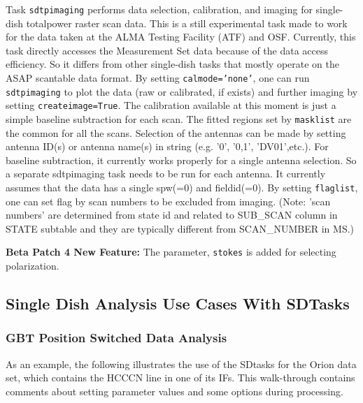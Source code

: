         Task {\tt sdtpimaging} performs data selection, calibration, and imaging for single-dish
        totalpower raster scan data.  This is a still experimental task made to work for
        the data taken at the ALMA Testing Facility (ATF) and OSF. Currently, this task directly
        accesses the Measurement Set data because of the data access efficiency.
        So it differs from other single-dish tasks that mostly operate on the ASAP scantable
        data format.  By setting {\tt calmode='none'}, one can run {\tt sdtpimaging} to plot the data
        (raw or calibrated, if exists) and further imaging by setting {\tt createimage=True}.
        The calibration available at this moment is just a simple baseline subtraction for
        each scan. The fitted regions set by {\tt masklist} are the common for all the scans.
        Selection of the antennas can be made by setting antenna ID(s) or antenna name(s)
        in string (e.g. '0', '0,1', 'DV01',etc.).
        For baseline subtraction, it currently works properly for a single antenna selection.
        So a separate sdtpimaging task needs to be run for each antenna.
        It currently assumes that the data has a single spw(=0) and fieldid(=0).
        By setting {\tt flaglist}, one can set flag by scan numbers to be excluded from imaging.
        (Note: 'scan numbers' are determined from state id and related to SUB\_SCAN column in STATE
        subtable and they are typically different from SCAN\_NUMBER in MS.)

        {\bf Beta Patch 4 New Feature:}
        The parameter, {\tt stokes} is added for selecting polarization.  

\subsection{Single Dish Analysis Use Cases With SDTasks}
\label{section:sd.sdtasks.usecase}

\subsubsection{GBT Position Switched Data Analysis}
As an example, the following illustrates the use of the SDtasks for
the Orion data set, which contains the HCCCN line in one of its IFs.
This walk-through contains comments about setting parameter values
and some options during processing.

